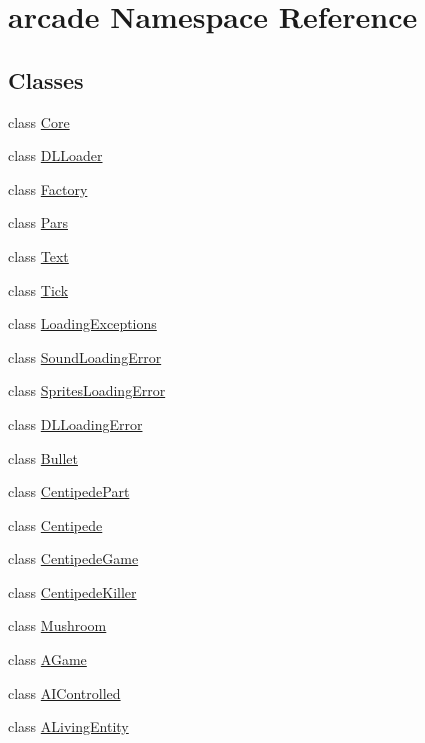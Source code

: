 \hypertarget{namespacearcade}{\section{arcade Namespace Reference}
\label{namespacearcade}
}
\subsection*{Classes}
\begin{DoxyCompactItemize}
\item 
class \hyperlink{classarcade_1_1_core}{Core}
\item 
class \hyperlink{classarcade_1_1_d_l_loader}{D\-L\-Loader}
\item 
class \hyperlink{classarcade_1_1_factory}{Factory}
\item 
class \hyperlink{classarcade_1_1_pars}{Pars}
\item 
class \hyperlink{classarcade_1_1_text}{Text}
\item 
class \hyperlink{classarcade_1_1_tick}{Tick}
\item 
class \hyperlink{classarcade_1_1_loading_exceptions}{Loading\-Exceptions}
\item 
class \hyperlink{classarcade_1_1_sound_loading_error}{Sound\-Loading\-Error}
\item 
class \hyperlink{classarcade_1_1_sprites_loading_error}{Sprites\-Loading\-Error}
\item 
class \hyperlink{classarcade_1_1_d_l_loading_error}{D\-L\-Loading\-Error}
\item 
class \hyperlink{classarcade_1_1_bullet}{Bullet}
\item 
class \hyperlink{classarcade_1_1_centipede_part}{Centipede\-Part}
\item 
class \hyperlink{classarcade_1_1_centipede}{Centipede}
\item 
class \hyperlink{classarcade_1_1_centipede_game}{Centipede\-Game}
\item 
class \hyperlink{classarcade_1_1_centipede_killer}{Centipede\-Killer}
\item 
class \hyperlink{classarcade_1_1_mushroom}{Mushroom}
\item 
class \hyperlink{classarcade_1_1_a_game}{A\-Game}
\item 
class \hyperlink{classarcade_1_1_a_i_controlled}{A\-I\-Controlled}
\item 
class \hyperlink{classarcade_1_1_a_living_entity}{A\-Living\-Entity}
\item 

\end{DoxyCompactItemize}
